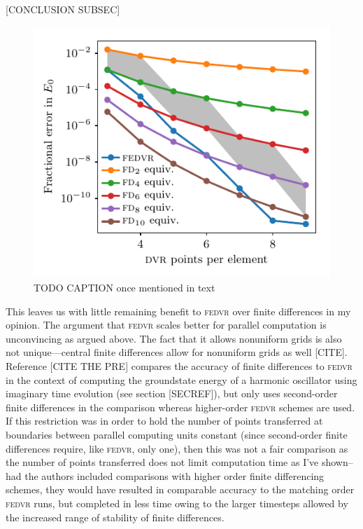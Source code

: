 [CONCLUSION SUBSEC]

\begin{figure}[t]
    \centerfloat
    \includegraphics{figures/numerics/fedvr_vs_fd_harmonic_groundstate.pdf}
    \caption{TODO CAPTION once mentioned in text}
    \label{fig:fedvr_vs_fd_harmonic_groundstate}
\end{figure}


This leaves us with little remaining benefit to \textsc{fedvr} over finite differences in my opinion. The argument that \textsc{fedvr} scales better for parallel computation is unconvincing as argued above. The fact that it allows nonuniform grids is also not unique---central finite differences allow for nonuniform grids as well [CITE]. Reference [CITE THE PRE] compares the accuracy of finite differences to \textsc{fedvr} in the context of computing the groundstate energy of a harmonic oscillator using imaginary time evolution (see section [SECREF]), but only uses second-order finite differences in the comparison whereas higher-order \textsc{fedvr} schemes are used. If this restriction was in order to hold the number of points transferred at boundaries between parallel computing units constant (since second-order finite differences require, like \textsc{fedvr}, only one), then this was not a fair comparison as the number of points transferred does not limit computation time as I've shown--had the authors included comparisons with higher order finite differencing schemes, they would have resulted in comparable accuracy to the matching order \textsc{fedvr} runs, but completed in less time owing to the larger timesteps allowed by the increased range of stability of finite differences.

